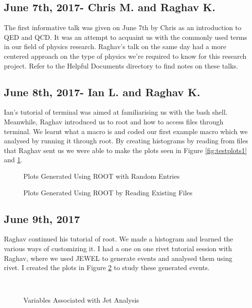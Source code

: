 \documentclass{article}
\begin{document}
\subsection{June 7th, 2017- Chris M. and Raghav K.}
The first informative talk was given on June 7th by Chris as an introduction to QED and QCD. It was an attempt to acquaint us with the commonly used terms in our field of physics research.
Raghav's talk on the same day had a more centered approach on the type of physics we're required to know for this research project.
Refer to the Helpful Documents directory to find notes on these talks.

\subsection{June 8th, 2017- Ian L. and Raghav K.}
Ian's tutorial of terminal was aimed at familiarising us with the bash shell. Meanwhile, Raghav introduced us to root and how to access files through terminal. We learnt what a macro is and coded our first example macro which we analysed by running it through root. By creating histograms by reading from files that Raghav sent us we were able to make the plots seen in Figure \ref{fig:testplots1} and \ref{fig:testplots2}.

\begin{figure}[H]
\centering
{} 
\caption{Plots Generated Using ROOT with Random Entries}
\label{fig:testplots1}
\caption{Plots Generated Using ROOT by Reading Existing Files}
\label{fig:testplots2}
\end{figure}

\subsection{June 9th, 2017}
Raghav continued his tutorial of root. We made a histogram and learned the various ways of customizing it.
I had a one on one rivet tutorial session with Raghav, where we used JEWEL to generate events and analysed them using rivet. I created the plots in Figure \ref{fig:jetvars} to study these generated events.
\begin{figure}[H]
\centering
{} 
\\
\caption{Variables Associated with Jet Analysis}
\label{fig:jetvars}
\end{figure}
\end{document}
